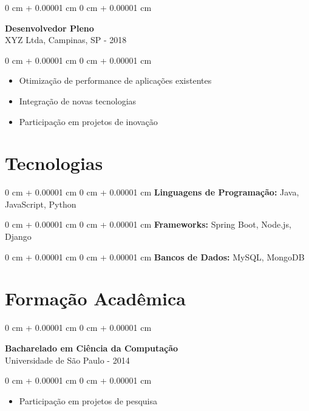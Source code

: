 \documentclass[10pt, letterpaper]{article}
\newenvironment{highlights}{
    \begin{itemize}[
        topsep=0.10 cm,
        parsep=0.10 cm,
        partopsep=0pt,
        itemsep=0pt,
        leftmargin=0 cm + 10pt
    ]
}{
    \end{itemize}
}
\newenvironment{onecolentry}{
    \begin{adjustwidth}{
        0 cm + 0.00001 cm
    }{
        0 cm + 0.00001 cm
    }
}{
    \end{adjustwidth}
}
\begin{document}
\vspace{0.2cm}

\begin{onecolentry}
    \setcolumnwidth{\fill, 4.5cm}
    \begin{paracol}{2}
        \textbf{Desenvolvedor Pleno} \\ XYZ Ltda, Campinas, SP
        \switchcolumn
         - 2018
    \end{paracol}
\end{onecolentry}
\vspace{0.10cm}
\begin{onecolentry}
    \begin{highlights}
                \item Otimização de performance de aplicações existentes
                \item Integração de novas tecnologias
                \item Participação em projetos de inovação
    \end{highlights}
\end{onecolentry}

\section{Tecnologias}
\begin{onecolentry}{\textbf{Linguagens de Programação:} Java, JavaScript, Python}\end{onecolentry}
\vspace{0.1cm}
\begin{onecolentry}{\textbf{Frameworks:} Spring Boot, Node.js, Django}\end{onecolentry}
\vspace{0.1cm}
\begin{onecolentry}{\textbf{Bancos de Dados:} MySQL, MongoDB}\end{onecolentry}
\section{Formação Acadêmica}

\begin{onecolentry}
    \setcolumnwidth{\fill, 4.5cm}
    \begin{paracol}{2}
        \textbf{Bacharelado em Ciência da Computação} \\ Universidade de São Paulo
        \switchcolumn
         - 2014
    \end{paracol}
\end{onecolentry}
\vspace{0.10cm}
\begin{onecolentry}
    \begin{highlights}
                \item Participação em projetos de pesquisa
    \end{highlights}
\end{onecolentry}
\end{document}
